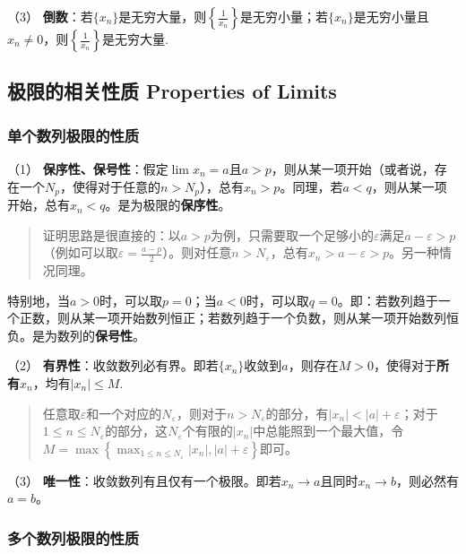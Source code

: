 （3）
\textbf{倒数}：若\(\{x_n\}\)是无穷大量，则\(\displaystyle \left\{\frac{1}{x_n}\right\}\)是无穷小量；若\(\{x_n\}\)是无穷小量且\(x_n\neq 0\)，则\(\displaystyle \left\{\frac{1}{x_n}\right\}\)是无穷大量.

\subsection{极限的相关性质 Properties of
Limits}\label{ux6781ux9650ux7684ux76f8ux5173ux6027ux8d28-properties-of-limits}

\subsubsection{单个数列极限的性质}\label{ux5355ux4e2aux6570ux5217ux6781ux9650ux7684ux6027ux8d28}

（1）
\textbf{保序性、保号性}：假定\(\lim x_n = a\)且\(a > p\)，则从某一项开始（或者说，存在一个\(N_p\)，使得对于任意的\(n>N_p\)），总有\(x_n>p\)。同理，若\(a < q\)，则从某一项开始，总有\(x_n < q\)。是为极限的\textbf{保序性}。

\begin{quote}
证明思路是很直接的：以\(a>p\)为例，只需要取一个足够小的\(\varepsilon\)满足\(a-\varepsilon>p\)（例如可以取\(\displaystyle \varepsilon=\frac{a-p}{2}\)）。则对任意\(n>N_\varepsilon\)，总有\(x_n>a-\varepsilon>p\)。另一种情况同理。
\end{quote}

特别地，当\(a>0\)时，可以取\(p=0\)；当\(a<0\)时，可以取\(q=0\)。即：若数列趋于一个正数，则从某一项开始数列恒正；若数列趋于一个负数，则从某一项开始数列恒负。是为数列的\textbf{保号性}。

（2）
\textbf{有界性}：收敛数列必有界。即若\(\{x_n\}\)收敛到\(a\)，则存在\(M>0\)，使得对于\textbf{所有}\(x_n\)，均有\(\vert x_n\vert \leqslant M\).

\begin{quote}
任意取\(\varepsilon\)和一个对应的\(N_\varepsilon\)，则对于\(n>N_\varepsilon\)的部分，有\(\vert x_n \vert < \vert a\vert + \varepsilon\)；对于\(1\leqslant n \leqslant N_\varepsilon\)的部分，这\(N_\varepsilon\)个有限的\(\vert x_n \vert\)中总能照到一个最大值，令\(\displaystyle M=\max\left\{\max_{1\leqslant n\leqslant N_\varepsilon}|x_n|, \vert a\vert + \varepsilon\right\}\)即可。
\end{quote}

（3）
\textbf{唯一性}：收敛数列有且仅有一个极限。即若\(x_n\rightarrow a\)且同时\(x_n\rightarrow b\)，则必然有\(a=b\)。

\subsubsection{多个数列极限的性质}\label{ux591aux4e2aux6570ux5217ux6781ux9650ux7684ux6027ux8d28}
